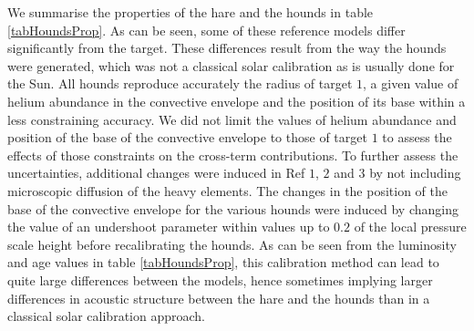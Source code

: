 \documentclass[a4paper,fleqn,usenatbib]{mnras}
\begin{document}
We summarise the properties of the hare and the hounds in table \ref{tabHoundsProp}. As can be seen, some of these reference models differ significantly from the target. These differences result from the way the hounds were generated, which was not a classical solar calibration as is usually done for the Sun. All hounds reproduce accurately the radius of target $1$, a given value of helium abundance in the convective envelope and the position of its base within a less constraining accuracy. We did not limit the values of helium abundance and position of the base of the convective envelope to those of target $1$ to assess the effects of those constraints on the cross-term contributions. To further assess the uncertainties, additional changes were induced in Ref $1$, $2$ and $3$ by not including microscopic diffusion of the heavy elements. The changes in the position of the base of the convective envelope for the various hounds were induced by changing the value of an undershoot parameter within values up to $0.2$ of the local pressure scale height before recalibrating the hounds. As can be seen from the luminosity and age values in table \ref{tabHoundsProp}, this calibration method can lead to quite large differences between the models, hence sometimes implying larger differences in acoustic structure between the hare and the hounds than in a classical solar calibration approach. 
\end{document}
